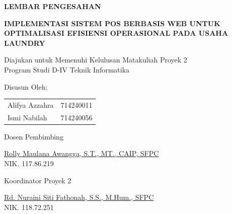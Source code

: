 
\clearpage
{}

\fancyhfoffset[L]{1.25cm}
\fancyhfoffset[R]{-1.25cm}

{}

\vfill

\begin{center}
    {\fontsize{14}{16}\selectfont\bfseries LEMBAR PENGESAHAN}
\end{center}

\vspace{0.8cm}

\begin{center}
    {\bfseries\fontsize{12}{14}\selectfont
    IMPLEMENTASI SISTEM POS BERBASIS WEB UNTUK \\
    OPTIMALISASI EFISIENSI OPERASIONAL PADA USAHA LAUNDRY}
\end{center}

\vspace{0.8cm}

\begin{center}
    Diajukan untuk Memenuhi Kelulusan Matakuliah Proyek 2 \\
    Program Studi D-IV Teknik Informatika
    
    \vspace{1cm}
    Disusun Oleh:
    
    \vspace{0.3cm}
    \begin{tabular}{lc}
        Alifya Azzahra & 714240011 \\
        Ismi Nabilah & 714240056
    \end{tabular}
\end{center}

\vspace{1.5cm}

\noindent
\begin{minipage}[t]{0.48\textwidth}
    \begin{center}
        Dosen Pembimbing
        \vspace{2.5cm} 
        
        \underline{Rolly Maulana Awangga, S.T., MT., CAIP, SFPC}\\
        NIK. 117.86.219
    \end{center}
\end{minipage}%
\hfill%
\begin{minipage}[t]{0.48\textwidth}
    \begin{center}
        Koordinator Proyek 2
        \vspace{2.5cm} 
        
        \underline{Rd. Nuraini Siti Fathonah, S.S., M.Hum., SFPC}\\
        NIK. 118.72.251
    \end{center}
\end{minipage}

